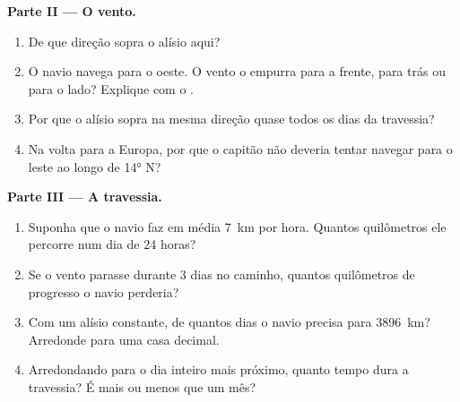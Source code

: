 \begin{problem}
\noindent\textbf{Parte II --- O vento.}\par\nopagebreak
\begin{enumerate}[resume, beginpenalty=10000]
  \item De que direção sopra o alísio aqui?
  \item O navio navega para o oeste. O vento o empurra para a frente, para
        trás ou para o lado? Explique com o .
  \item Por que o alísio sopra na mesma direção quase todos os dias da
        travessia?
  \item Na volta para a Europa, por que o capitão não deveria tentar
        navegar para o leste ao longo de \ang{14} N?
\end{enumerate}

\noindent\textbf{Parte III --- A travessia.}\par\nopagebreak
\begin{enumerate}[resume, beginpenalty=10000]
  \item Suponha que o navio faz em média \qty{7}{km} por hora. Quantos
        quilômetros ele percorre num dia de 24 horas?
  \item Se o vento parasse durante 3 dias no caminho, quantos quilômetros
        de progresso o navio perderia?
  \item Com um alísio constante, de quantos dias o navio precisa para
        \qty{3896}{km}? Arredonde para uma casa decimal.
  \item Arredondando para o dia inteiro mais próximo, quanto tempo dura a
        travessia? É mais ou menos que um mês?
\end{enumerate}
\end{problem}
